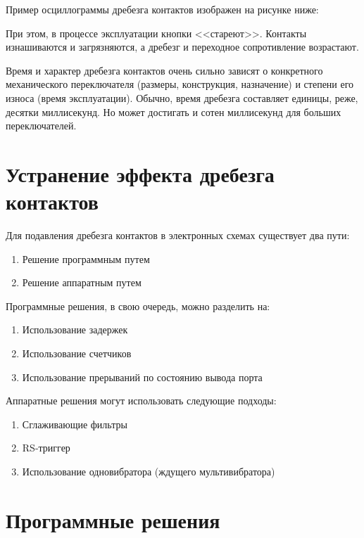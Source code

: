 \documentclass{altsu-report}
\begin{document}
Пример осциллограммы дребезга контактов изображен на рисунке ниже:

При этом, в процессе эксплуатации кнопки <<стареют>>. Контакты изнашиваются и загрязняются, а дребезг и переходное сопротивление возрастают.

Время и характер дребезга контактов очень сильно зависят о конкретного механического переключателя (размеры, конструкция, назначение) и степени его износа (время эксплуатации). Обычно, время дребезга составляет единицы, реже, десятки миллисекунд. Но может достигать и сотен миллисекунд для больших переключателей.

\section*{Устранение эффекта дребезга контактов}

Для подавления дребезга контактов в электронных схемах существует два пути:

\begin{enumerate}
    \item Решение программным путем

    \item Решение аппаратным путем
\end{enumerate}

Программные решения, в свою очередь, можно разделить на:

\begin{enumerate}
    \item Использование задержек

    \item Использование счетчиков

    \item Использование прерываний по состоянию вывода порта
\end{enumerate}

Аппаратные решения могут использовать следующие подходы:

\begin{enumerate}
    \item Сглаживающие фильтры

    \item RS-триггер

    \item Использование одновибратора (ждущего мультивибратора)
\end{enumerate}

\section*{Программные решения}
\end{document}
